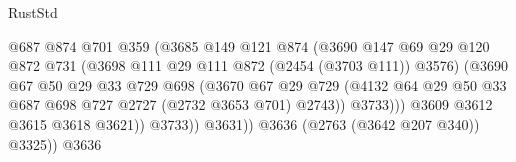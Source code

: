 \begin{lexlean}{RustStd}
\begin{coremodule}
                                          @687
                                          @874
                                          @701
                                          @359
                                          (@3685
                                            @149
                                            @121
                                            @874
                                            (@3690
                                              @147
                                              @69
                                              @29
                                              @120
                                              @872
                                              @731
                                              (@3698 @111 @29 @111 @872 (@2454 (@3703 @111)) @3576)
                                              (@3690
                                                @67
                                                @50
                                                @29
                                                @33
                                                @729
                                                @698
                                                (@3670
                                                  @67
                                                  @29
                                                  @729
                                                  (@4132
                                                    @64
                                                    @29
                                                    @50
                                                    @33
                                                    @687
                                                    @698
                                                    @727
                                                    @2727
                                                    (@2732 @3653 @701)
                                                    @2743))
                                                @3733)))
                                          @3609
                                          @3612
                                          @3615
                                          @3618
                                          @3621))
                                      @3733))
                                  @3631))
                              @3636
                              (@2763 (@3642 @207 @340))
                              @3325))
                          @3636

\end{coremodule}
\end{lexlean}
